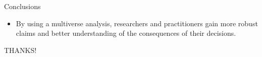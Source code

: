 \documentclass[aspectratio=169]{beamer}
\begin{document}
\begin{frame}{Conclusions}
  \centering
  \begin{itemize}
    \item By using a multiverse analysis, researchers and practitioners gain more robust claims and better understanding of the consequences of their decisions.
  \end{itemize}
\end{frame}

\begin{frame}
    \color{Pink} 
    \centering
     THANKS!
\end{frame}
\end{document}
